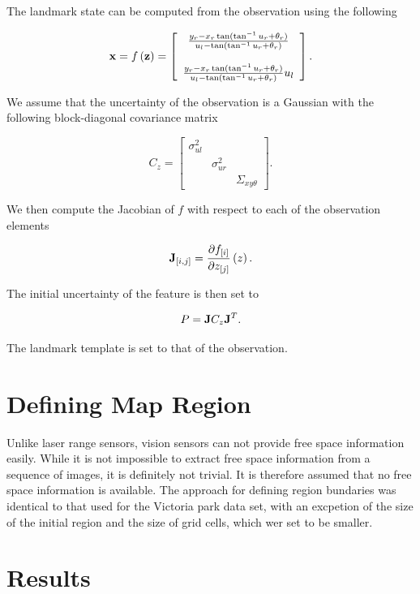 The landmark state can be computed from the observation using the
following

$$
{\bf x} = f\left({\bf z}\right) 
= \left[\begin{array}{c}
\frac{y_r - x_r\tan(\tan^{-1} u_r+\theta_r)}{u_l-\tan(\tan^{-1} u_r+\theta_r) }\\
{}\\
\frac{y_r - x_r\tan(\tan^{-1} u_r+\theta_r)}{u_l-\tan(\tan^{-1} u_r+\theta_r)}u_l
\end{array}
\right].
$$

We assume that the uncertainty of the observation is a Gaussian with
the following block-diagonal covariance matrix

$$
C_z = \left[
  \begin{array}{ccc}
    \sigma^2_{ul} &             & \\
                & \sigma^2_{ur} & \\
                &             & \Sigma_{xy\theta}
  \end{array}
\right].
$$

We then compute the Jacobian of $f$ with respect to each of the
observation elements

$$
{\bf J}_{[i,j]} = \frac{\partial f_{[i]}}
{\partial z_{[j]}}\left(z \right).
$$

The initial uncertainty of the feature is then set to

$$
P = {\bf J} C_z {\bf J}^T.
$$

The landmark template is set to that of the observation.

\section{Defining Map Region}

Unlike laser range sensors, vision sensors can not provide free space
information easily. While it is not impossible to extract free space
information from a sequence of images, it is definitely not
trivial. It is therefore assumed that no free space information is
available. The approach for defining region bundaries was identical to
that used for the Victoria park data set, with an excpetion of the
size of the initial region and the size of grid cells, which wer set
to be smaller.

\section{Results}

